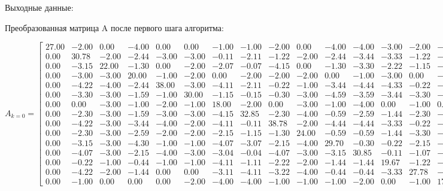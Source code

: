 \documentclass[a4paper, 12pt]{article}
\begin{document}
\normalsize Выходные данные:

Преобразованная матрица A после первого шага алгоритма:
\scriptsize

\[A_{k = 0} = 
\left[{
	\begin{array}{rrrrrrrrrrrrrrr}
	27.00 & -2.00 & 0.00 & -4.00 & 0.00 & 0.00 & -1.00 & -1.00 & -2.00 & 0.00 & -4.00 & -4.00 & -3.00 & -2.00 & -3.00 \\
	0.00 & 30.78 & -2.00 & -2.44 & -3.00 & -3.00 & -0.11 & -2.11 & -1.22 & -2.00 & -2.44 & -3.44 & -3.33 & -1.22 & -4.33 \\
	0.00 & -3.15 & 22.00 & -1.30 & 0.00 & -2.00 & -2.07 & -0.07 & -4.15 & 0.00 & -1.30 & -3.30 & -2.22 & -1.15 & -1.22 \\
	0.00 & -3.00 & -3.00 & 20.00 & -1.00 & -2.00 & 0.00 & -2.00 & -2.00 & -2.00 & 0.00 & -1.00 & -3.00 & 0.00 & -1.00 \\
	0.00 & -4.22 & -4.00 & -2.44 & 38.00 & -3.00 & -4.11 & -2.11 & -0.22 & -1.00 & -3.44 & -4.44 & -4.33 & -0.22 & -4.33 \\
	0.00 & -3.30 & -3.00 & -1.59 & -1.00 & 30.00 & -1.15 & -0.15 & -0.30 & -3.00 & -4.59 & -3.59 & -3.44 & -3.30 & -1.44 \\
	0.00 & 0.00 & -3.00 & -1.00 & -2.00 & -1.00 & 18.00 & -2.00 & 0.00 & -3.00 & -1.00 & -4.00 & 0.00 & -1.00 & 0.00 \\
	0.00 & -2.30 & -3.00 & -1.59 & -3.00 & -3.00 & -4.15 & 32.85 & -2.30 & -4.00 & -0.59 & -2.59 & -1.44 & -2.30 & -2.44 \\
	0.00 & -4.22 & -3.00 & -3.44 & -4.00 & -2.00 & -4.11 & -0.11 & 38.78 & -2.00 & -4.44 & -4.44 & -3.33 & -0.22 & -3.33 \\
	0.00 & -2.30 & -3.00 & -2.59 & -2.00 & -2.00 & -2.15 & -1.15 & -1.30 & 24.00 & -0.59 & -0.59 & -1.44 & -3.30 & -1.44 \\
	0.00 & -3.15 & -3.00 & -4.30 & -1.00 & -1.00 & -4.07 & -3.07 & -2.15 & -4.00 & 29.70 & -0.30 & -0.22 & -2.15 & -1.22 \\
	0.00 & -4.07 & -3.00 & -2.15 & -4.00 & -3.00 & -3.04 & -0.04 & -4.07 & -3.00 & -3.15 & 30.85 & -0.11 & -1.07 & -0.11 \\
	0.00 & -0.22 & -1.00 & -0.44 & -1.00 & -1.00 & -4.11 & -1.11 & -2.22 & -2.00 & -1.44 & -1.44 & 19.67 & -1.22 & -2.33 \\
	0.00 & -4.22 & -2.00 & -1.44 & 0.00 & 0.00 & -3.11 & -4.11 & -3.22 & -4.00 & -0.44 & -0.44 & -3.33 & 27.78 & -1.33 \\
	0.00 & -1.00 & 0.00 & 0.00 & 0.00 & -2.00 & -4.00 & -4.00 & -1.00 & -1.00 & -1.00 & -2.00 & 0.00 & -1.00 & 17.00
	\end{array} 
}\right]\]
\end{document}

